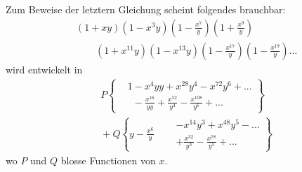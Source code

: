 \begingroup
\newcommand{\TransBracket}[1]{\boldsymbol{[}#1\boldsymbol{]}}
\noindent[S. 46]\par
\par\indent Zum Beweise der letztern Gleichung scheint folgendes brauchbar:
\[\begin{aligned}
&(1+xy)(1-x^3y)\left(1-\frac{x^7}{y}\right)\left(1+\frac{x^9}{y}\right)\\
&\qquad(1+x^{11}y)(1-x^{13}y)\left(1-\frac{x^{17}}{y}\right)\left(1-\frac{x^{19}}{y}\right){.}{.}{.}
\end{aligned}\]
\noindent wird entwickelt in
\[\begin{aligned}
&P\left\{\begin{aligned}
&1-x^4yy+x^{28}y^4-x^{72}y^6+{.}{.}{.}\\
&\phantom{1}{-}\frac{x^{16}}{yy}+\frac{x^{52}}{y^4}-\frac{x^{108}}{y^6}+{.}{.}{.}
\end{aligned}\right\}\\[1ex]
&{}+Q\left\{y-\frac{x^6}{y}\quad\begin{aligned}
&-x^{14}y^3+x^{48}y^5-{.}{.}{.}\\
&+\frac{x^{32}}{y^3}-\frac{x^{78}}{y^5}+{.}{.}{.}
\end{aligned}\right\}
\end{aligned}\]
\noindent wo $P$ und $Q$ blosse Functionen von $x$.

